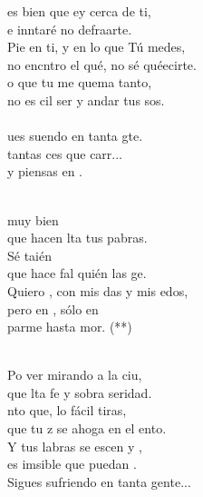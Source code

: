 \begin{cancion}[Piensas en mí][Nico]%
	es bien que ey cerca de ti,\\
	e inntaré no defraarte.\\
	Pie en ti, y en lo que Tú medes,\\
	no encntro el qué, no sé quéecirte.\\
	o que tu  me quema tanto,\\
	no es cil ser y andar tus sos. \\
\jump\\
	ues suendo en tanta gte. \\
	 tantas ces que carr...\\
	y  piensas en .  \\\jump\\
	\begin{chorus}%
	 muy bien  \\
	que hacen lta tus pabras.\\
	Sé taién \\
	que hace fal quién las ge.\\
	Quiero , con mis das y mis edos,\\
	pero en , sólo en\\
	parme hasta mor. (**)\\
	\end{chorus}%
	\jump\\
	Po ver mirando a la ciu,\\
	que lta fe y sobra seridad.\\
	nto que, lo fácil tiras, \\
	que tu z se ahoga en el ento.\\
	Y tus labras se escen y , \\
	es imsible que puedan .\\
Sigues sufriendo en tanta gente...\\
\end{cancion}%
